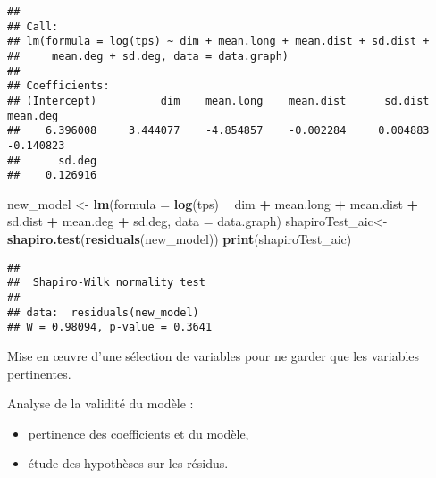 \documentclass[]{article}
\newenvironment{Shaded}{\begin{snugshade}}{\end{snugshade}}
\newcommand{\DataTypeTok}[1]{\textcolor[rgb]{0.13,0.29,0.53}{#1}}
\newcommand{\KeywordTok}[1]{\textcolor[rgb]{0.13,0.29,0.53}{\textbf{#1}}}
\newcommand{\NormalTok}[1]{#1}
\newcommand{\OperatorTok}[1]{\textcolor[rgb]{0.81,0.36,0.00}{\textbf{#1}}}
\newcommand{\StringTok}[1]{\textcolor[rgb]{0.31,0.60,0.02}{#1}}
\begin{document}
\begin{verbatim}
## 
## Call:
## lm(formula = log(tps) ~ dim + mean.long + mean.dist + sd.dist + 
##     mean.deg + sd.deg, data = data.graph)
## 
## Coefficients:
## (Intercept)          dim    mean.long    mean.dist      sd.dist     mean.deg  
##    6.396008     3.444077    -4.854857    -0.002284     0.004883    -0.140823  
##      sd.deg  
##    0.126916
\end{verbatim}

\begin{Shaded}
\begin{Highlighting}[]
\NormalTok{new_model <-}\StringTok{ }\KeywordTok{lm}\NormalTok{(}\DataTypeTok{formula =} \KeywordTok{log}\NormalTok{(tps) }\OperatorTok{~}\StringTok{ }\NormalTok{dim }\OperatorTok{+}\StringTok{ }\NormalTok{mean.long }\OperatorTok{+}\StringTok{ }\NormalTok{mean.dist }\OperatorTok{+}\StringTok{ }\NormalTok{sd.dist }\OperatorTok{+}\StringTok{ }
\StringTok{    }\NormalTok{mean.deg }\OperatorTok{+}\StringTok{ }\NormalTok{sd.deg, }\DataTypeTok{data =}\NormalTok{ data.graph)}
\NormalTok{shapiroTest_aic<-}\KeywordTok{shapiro.test}\NormalTok{(}\KeywordTok{residuals}\NormalTok{(new_model))}
\KeywordTok{print}\NormalTok{(shapiroTest_aic)}
\end{Highlighting}
\end{Shaded}

\begin{verbatim}
## 
##  Shapiro-Wilk normality test
## 
## data:  residuals(new_model)
## W = 0.98094, p-value = 0.3641
\end{verbatim}

Mise en \oe uvre d'une sélection de variables pour ne garder que les
variables pertinentes.

Analyse de la validité du modèle :

\begin{itemize}
\item
  pertinence des coefficients et du modèle,
\item
  étude des hypothèses sur les résidus.
\end{itemize}
\end{document}
